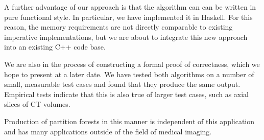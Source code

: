\documentclass{ouclprgsc}
\begin{document}
A further advantage of our approach is that the algorithm can can be
written in pure functional style. In particular, we have implemented
it in Haskell. For this reason, the memory requirements are not
directly comparable to existing imperative implementations, but we are
about to integrate this new approach into an existing C++ code base.

We are also in the process of constructing a formal proof of
correctness, which we hope to present at a later date. We have tested
both algorithms on a number of small, measurable test cases and found
that they produce the same output. Empirical tests indicate that this
is also true of larger test cases, such as axial slices of CT volumes.

Production of partition forests in this manner is independent of this
application and has many applications outside of the field of medical
imaging.


\begin{thebibliography}{2}
 	





\end{thebibliography}
\end{document}
